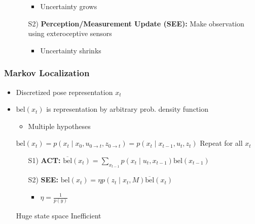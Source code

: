 \begin{itemize}
\begin{itemize}
                \begin{itemize}
                    \item Uncertainty grows
                \end{itemize}
            \item[S2)] \textbf{Perception/Measurement Update (SEE):} Make observation using exteroceptive sensors
                \begin{itemize}
                    \item Uncertainty shrinks
                \end{itemize}
        \end{itemize}
\end{itemize}

\subsubsection{Markov Localization}
\begin{itemize}
    \item Discretized pose representation $x_t$
    \item $\text{bel}(x_t)$ is representation by arbitrary prob. density function
        \begin{itemize}
            \item Multiple hypotheses
        \end{itemize}
     $\text{bel}(x_t) = p(x_t \mid x_0, u_{0 \to t}, z_{0 \to t}) = p(x_t \mid x_{t - 1}, u_t, z_t)$
     Repeat for all $x_t$ 
        \begin{itemize}
            \item[S1)] \textbf{ACT:} $\overline{\text{bel}}(x_t) = \sum_{x_{t-1}} p(x_t \mid u_t, x_{t - 1}) \text{bel}(x_{t-1})$
            \item[S2)] \textbf{SEE:} $\text{bel}(x_t) = \eta p(z_t \mid x_t, M) \overline{\text{bel}}(x_t)$
                \begin{itemize}
                    \item $\eta = \frac{1}{p(y)}$
                \end{itemize}
        \end{itemize}
    \icon Huge state space
    \icon Inefficient
\end{itemize}

